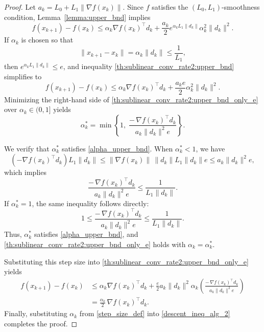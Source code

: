 \documentclass[runningheads]{llncs}
\begin{document}
	\begin{proof}
		Let $a_{k}=L_{0}+L_{1}\|\nabla f(x_{k})\|$.  
		Since $f$ satisfies the $(L_{0},L_{1})$-smoothness condition, 
		Lemma~\ref{lemma:upper_bnd} implies
		\begin{equation}\label{th:sublinear_conv_rate2:upper_bnd}
			f(x_{k+1})-f(x_{k})
			\le \alpha_{k}\nabla f(x_{k})^{\top}d_{k}
			+\frac{a_{k}}{2}e^{\alpha_{k}L_{1}\|d_{k}\|}
			\alpha_{k}^{2}\|d_{k}\|^{2}.
		\end{equation}
		If $\alpha_{k}$ is chosen so that
		\begin{equation}\label{alpha_upper_bnd}
			\|x_{k+1}-x_{k}\| = \alpha_{k}\|d_{k}\| \le \frac{1}{L_{1}},
		\end{equation}
		then $e^{\alpha_{k}L_{1}\|d_{k}\|} \le e$, and inequality
		\eqref{th:sublinear_conv_rate2:upper_bnd} simplifies to
		\begin{equation}\label{th:sublinear_conv_rate2:upper_bnd_only_e}
			f(x_{k+1})-f(x_{k})
			\le \alpha_{k}\nabla f(x_{k})^{\top}d_{k}
			+\frac{a_{k}e}{2}\alpha_{k}^{2}\|d_{k}\|^{2}.
		\end{equation}
		Minimizing the right-hand side of 
		\eqref{th:sublinear_conv_rate2:upper_bnd_only_e} 
		over $\alpha_{k}\in(0,1]$ yields
		\begin{equation}\label{step_size_def}
			\alpha_{k}^{*}
			=\min\!\left\{1,\;
			\frac{-\,\nabla f(x_{k})^{\top}d_{k}}
			{a_{k}\|d_{k}\|^{2}e}\right\}.
		\end{equation}
		
		We verify that $\alpha_{k}^{*}$ satisfies \eqref{alpha_upper_bnd}.  
		When $\alpha_{k}^{*}<1$, we have
		\[
		(-\nabla f(x_{k})^{\top}d_{k})L_{1}\|d_{k}\|
		\le \|\nabla f(x_{k})\|\,\|d_{k}\|L_{1}\|d_{k}\|e
		\le a_{k}\|d_{k}\|^{2}e,
		\]
		which implies
		\[
		\frac{-\,\nabla f(x_{k})^{\top}d_{k}}
		{a_{k}\|d_{k}\|^{2}e}
		\le \frac{1}{L_{1}\|d_{k}\|}.
		\]
		If $\alpha_{k}^{*}=1$, the same inequality follows directly:
		\[
		1\le 
		\frac{-\,\nabla f(x_{k})^{\top}d_{k}}
		{a_{k}\|d_{k}\|^{2}e}
		\le \frac{1}{L_{1}\|d_{k}\|}.
		\]
		Thus, $\alpha_{k}^{*}$ satisfies \eqref{alpha_upper_bnd}, and 
		\eqref{th:sublinear_conv_rate2:upper_bnd_only_e} 
		holds with $\alpha_{k}=\alpha_{k}^{*}$.
		
		Substituting this step size into 
		\eqref{th:sublinear_conv_rate2:upper_bnd_only_e} yields
		\begin{equation}\label{descent_ineq_alg_2}
			\begin{split}
				f(x_{k+1})-f(x_{k})
				&\le \alpha_{k}\nabla f(x_{k})^{\top}d_{k}
				+\frac{e}{2}a_{k}\|d_{k}\|^{2}\alpha_{k}
				\left(\frac{-\,\nabla f(x_{k})^{\top}d_{k}}
				{a_{k}\|d_{k}\|^{2}e}\right)\\
				&=\frac{\alpha_{k}}{2}\,\nabla f(x_{k})^{\top}d_{k}.
			\end{split}
		\end{equation}
		Finally, substituting $\alpha_{k}$ from 
		\eqref{step_size_def} into \eqref{descent_ineq_alg_2} 
		completes the proof.
	\end{proof}
	
\end{document}
